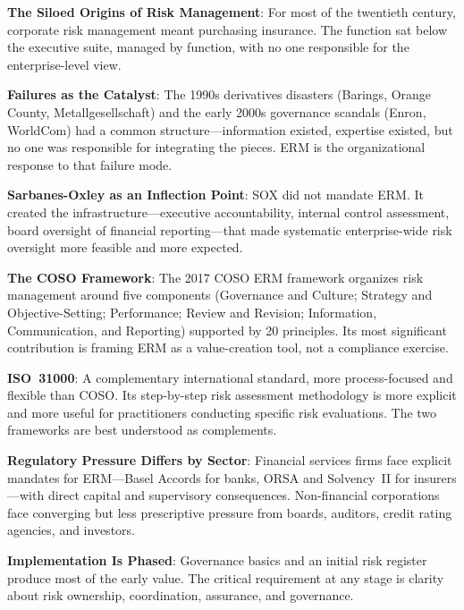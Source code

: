 \documentclass[11pt,openany]{book}
\begin{document}
\begin{keytakeaways}
\item
  \textbf{The Siloed Origins of Risk Management}: For most of the twentieth century, corporate risk management meant purchasing insurance. The function sat below the executive suite, managed by function, with no one responsible for the enterprise-level view.
\item
  \textbf{Failures as the Catalyst}: The 1990s derivatives disasters (Barings, Orange County, Metallgesellschaft) and the early 2000s governance scandals (Enron, WorldCom) had a common structure---information existed, expertise existed, but no one was responsible for integrating the pieces. ERM is the organizational response to that failure mode.
\item
  \textbf{Sarbanes-Oxley as an Inflection Point}: SOX did not mandate ERM. It created the infrastructure---executive accountability, internal control assessment, board oversight of financial reporting---that made systematic enterprise-wide risk oversight more feasible and more expected.
\item
  \textbf{The COSO Framework}: The 2017 COSO ERM framework organizes risk management around five components (Governance and Culture; Strategy and Objective-Setting; Performance; Review and Revision; Information, Communication, and Reporting) supported by 20 principles. Its most significant contribution is framing ERM as a value-creation tool, not a compliance exercise.
\item
  \textbf{ISO~31000}: A complementary international standard, more process-focused and flexible than COSO. Its step-by-step risk assessment methodology is more explicit and more useful for practitioners conducting specific risk evaluations. The two frameworks are best understood as complements.
\item
  \textbf{Regulatory Pressure Differs by Sector}: Financial services firms face explicit mandates for ERM---Basel Accords for banks, ORSA and Solvency~II for insurers---with direct capital and supervisory consequences. Non-financial corporations face converging but less prescriptive pressure from boards, auditors, credit rating agencies, and investors.
\item
  \textbf{Implementation Is Phased}: Governance basics and an initial risk register produce most of the early value. The critical requirement at any stage is clarity about risk ownership, coordination, assurance, and governance.
\end{keytakeaways}
\end{document}
